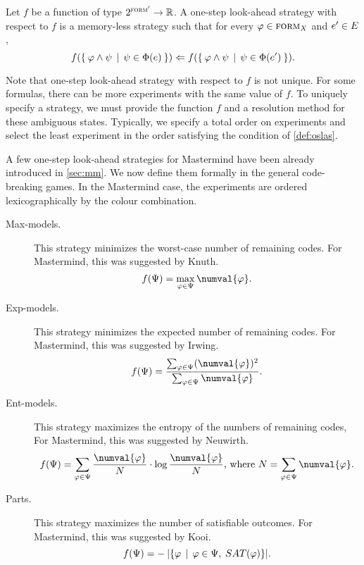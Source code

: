 \newcommand{\formset}{\Psi}
\begin{definition}\label{def:oslas}
Let $f$ be a function of type $2^{{\textsc{form}'}} -> \mathbb{R}$.
A one-step look-ahead strategy with respect to $f$ is
  a memory-less strategy such that
  for every $\varphi\in\textsc{form}_X$ and $e'\in E$,
\[
f(\{\:\varphi \wedge \psi \:\:|\:\: \psi\in\Phi(e) \:\}) <=
  f(\{\: \varphi \wedge \psi \:\:|\:\: \psi\in\Phi(e') \:\}).
\]
\end{definition}

Note that one-step look-ahead strategy with respect to $f$ is not unique.
For some formulas, there can be more experiments with the same value of $f$.
To uniquely specify a strategy, we must provide the function $f$ and
  a resolution method for these ambiguous states.
Typically, we specify a total order on experiments and select the least
  experiment in the order satisfying the condition of \autoref{def:oslas}.

A few one-step look-ahead strategies for Mastermind
  have been already introduced in \autoref{sec:mm}.
We now define them formally in the general code-breaking games.
In the Mastermind case,
  the experiments are ordered lexicographically by the colour combination.

\begin{description}
\item[Max-models.]
This strategy minimizes the worst-case number of remaining codes.
For Mastermind, this was suggested by Knuth\cite{mm-knuth}.
\[
f(\formset) = \max_{\form\in\formset} \numval{\form}.
\]

\item[Exp-models.]
This strategy minimizes the expected number of remaining codes.
  For Mastermind, this was suggested by Irwing\cite{mm-expnum}.
\[
f(\formset) = \frac{\sum_{\form\in\formset}(\numval{\form})^2}{\sum_{\form\in\formset} \numval{\form}}.
\]

\item[Ent-models.]
This strategy maximizes the entropy of the numbers of remaining codes,
For Mastermind, this was suggested by Neuwirth\cite{mm-entropy}.
\[
f(\formset) = \sum_{\form\in\formset} \frac{\numval{\form}}{N} \cdot \log \frac{\numval{\form}}{N}
  \textrm{, where } N = \sum_{\form\in\formset}\numval{\form}.
\]

\item[Parts.]
This strategy maximizes the number of satisfiable outcomes.
For Mastermind, this was suggested by Kooi\cite{mm-mostparts}.
\[
f(\formset) = - \:|\{ \form \| \form\in\formset, \;\SAT{\form} \}|.
\]
\end{description}

